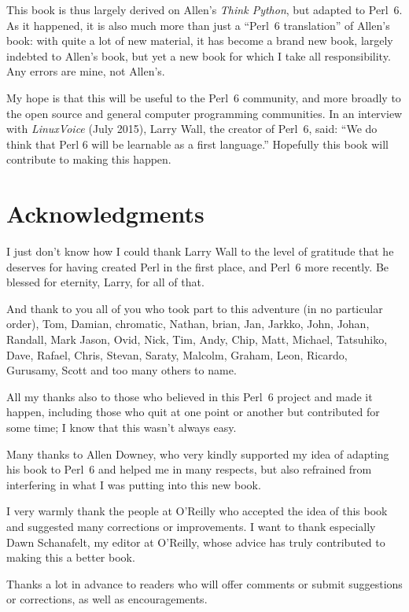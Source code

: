 This book is thus largely derived on Allen's \emph{Think Python}, 
but adapted to Perl~6. As it happened, it is also much more 
than just a ``Perl~6 translation'' of Allen's book: with 
quite a lot of new material, it has become a brand new book, 
largely indebted to Allen's book, but yet a new book for which 
I take all responsibility. Any errors are mine, 
not Allen's.

My hope is that this will be useful to the Perl~6 community, and 
more broadly to the open source and general 
computer programming communities. In an interview with 
\emph{LinuxVoice} (July 2015), Larry Wall, the creator of Perl~6, 
said: ``We do think that Perl 6 will be learnable as a first language.''
Hopefully this book will contribute to making this happen. 

\section*{Acknowledgments}

I just don't know how I could thank Larry Wall to the level of 
gratitude that he deserves for having created Perl in the first 
place, and Perl~6 more recently. Be blessed for eternity, Larry, 
for all of that. 

And thank to you all of you who took part to this 
adventure (in no particular order), Tom, Damian, 
chromatic, Nathan, brian, Jan, Jarkko, John, Johan, Randall, 
Mark Jason, Ovid, Nick, Tim, Andy, Chip, Matt, Michael, Tatsuhiko, 
Dave, Rafael, Chris, Stevan, Saraty, Malcolm, Graham, Leon, 
Ricardo, Gurusamy, Scott and too many others to name.  

All my thanks also to those who believed in 
this Perl~6 project and made it happen, including those who 
quit at one point or another but contributed for some 
time; I know that this wasn't always easy.

Many thanks to Allen Downey, who very kindly supported my idea of 
adapting his book to Perl~6 and helped me in many respects, but 
also refrained from interfering in what I was putting into 
this new book.

I very warmly thank the people at O'Reilly who accepted the 
idea of this book and suggested many corrections or 
improvements. I want to thank especially 
Dawn Schanafelt, my editor at O'Reilly, whose advice 
has truly contributed to making this a better book.

Thanks a lot in advance to readers who will offer comments 
or submit suggestions or corrections, as well as encouragements.

